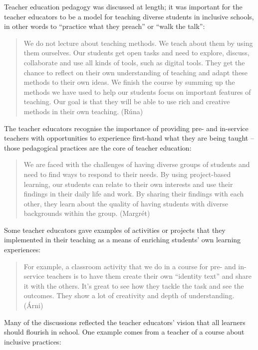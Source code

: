 \documentclass[output=paper]{langscibook}
\begin{document}
Teacher education pedagogy was discussed at length; it was important for the teacher educators to be a model for teaching diverse students in inclusive schools, in other words to “practice what they preach” or “walk the talk”:

\begin{quote}
We do not lecture about teaching methods. We teach about them by using them ourselves. Our students get open tasks and need to explore, discuss, collaborate and use all kinds of tools, such as digital tools. They get the chance to reflect on their own understanding of teaching and adapt these methods to their own ideas. We finish the course by summing up the methods we have used to help our students focus on important features of teaching. Our goal is that they will be able to use rich and creative methods in their own teaching. (Rúna)
\end{quote}

The teacher educators recognise the importance of providing pre- and in\hyp service teachers with opportunities to experience first-hand what they are being taught – those pedagogical practices are the core of teacher education:

\begin{quote}
We are faced with the challenges of having diverse groups of students and need to find ways to respond to their needs. By using project-based learning, our students can relate to their own interests and use their findings in  their daily life and work. By sharing their findings with each other, they learn about the quality of having students with diverse backgrounds within the group. (Margrét)
\end{quote}

Some teacher educators gave examples of activities or projects that they implemented in their teaching as a means of enriching students’ own learning experiences:

\begin{quote}
For example, a classroom activity that we do in a course for pre- and in-service teachers is to have them create their own “identity text” and share it with the others. It’s great to see how they tackle the task and see the outcomes. They show a lot of creativity and depth of understanding. (Árni)
\end{quote}

Many of the discussions reflected the teacher educators’ vision that all learners should flourish in school. One example comes from a teacher of a course about inclusive practices:
\end{document}
